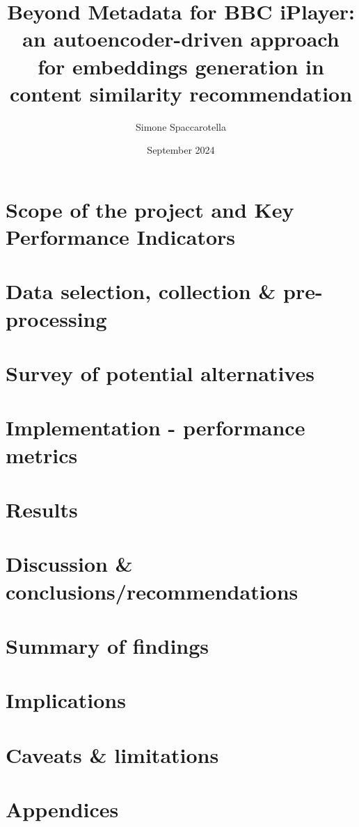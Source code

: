 \documentclass[12pt,a4paper]{article}
\begin{document}
\title{Beyond Metadata for BBC iPlayer:\\an autoencoder-driven approach for embeddings generation in content similarity recommendation}
\author{Simone Spaccarotella}
\date{September 2024}

\maketitle
\tableofcontents





% 

\section{Scope of the project and Key Performance Indicators}

\section{Data selection, collection \& pre-processing}

\section{Survey of potential alternatives}

\section{Implementation - performance metrics}

\section{Results}

\section{Discussion \& conclusions/recommendations}

\section{Summary of findings}

\section{Implications}

\section{Caveats \& limitations}

\section{Appendices}



\end{document}
